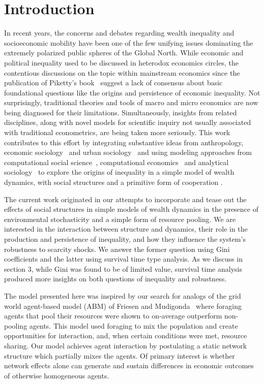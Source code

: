 \section{Introduction}
In recent years, the concerns and debates regarding wealth inequality and socioeconomic mobility have been one of the few unifying issues dominating the extremely polarized public spheres of the Global North. While economic and political inequality used to be discussed in heterodox economics circles, the contentious discussions on the topic within mainstream economics since the publication of Piketty's book~\cite{piketty2017capital} suggest a lack of consensus about basic foundational questions like the origins and persistence of economic inequality. Not surprisingly, traditional theories and tools of macro and micro economics are now being diagnosed for their limitations. Simultaneously, insights from related disciplines, along with novel models for scientific inquiry not usually associated with traditional econometrics, are being taken more seriously. This work contributes to this effort by integrating substantive ideas from anthropology, economic sociology~\cite{granovetter2017society} and urban sociology~\cite{sampson2012great} and using modeling approaches from computational social science~\cite{hedstrom2018}, computational economics~\cite{tesfatsion} and analytical sociology~\cite{hedstrom2011oxford} to explore the origins of inequality in a simple model of wealth dynamics, with social structures and a primitive form of cooperation .    

The current work originated in our attempts to incorporate and tease out the effects of social structures in simple models of wealth dynamics in the presence of environmental stochasticity and a simple form of resource pooling. We are interested in the interaction between structure and dynamics, their role in the production and persistence of inequality, and how they influence the system's robustness to scarcity shocks. We answer the former question using Gini coefficients and the latter using survival time type analysis. As we discuss in section 3, while Gini was found to be of limited value, survival time analysis produced more insights on both questions of inequality and robustness. 

The model presented here was inspired by our search for analogs of the grid world agent-based model (ABM) of Friesen and Mudi\-gonda~\cite{srimil} where foraging agents that pool their resources were shown to on-average outperform non-pooling agents. This model used foraging to mix the population and create opportunities for interaction, and, when certain conditions were met, resource sharing. Our model achieves agent interaction by postulating a static network structure which partially mixes the agents. Of primary interest is whether network effects alone can generate and sustain differences in economic outcomes of otherwise homogeneous agents.  

